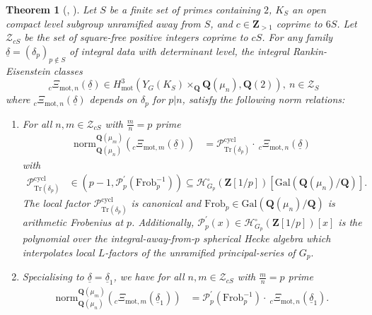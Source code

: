 \documentclass{amsart}%
\theoremstyle{plain}
\newtheorem{theorem}{Theorem}
\theoremstyle{plain}
\theoremstyle{remark}
\begin{document}
\begin{theorem}[, ]\label{thm intro A}Let $S$ be a finite set of primes containing $2$, $K_S$ an open compact level subgroup unramified away from $S$, and $c\in\mathbf{Z}_{>1}$ coprime to $6S$. Let $\mathscr{Z}_{cS}$ be the set of square-free positive integers coprime to $cS$. For \textit{any} family $\underline{\delta}=(\delta_p)_{p\notin S}$ of \textit{integral data with determinant level}, the integral Rankin-Eisenstein classes
$$_c\Xi_{\mathrm{mot},n}(\underline{\delta})\in H_\mathrm{mot}^3\left(Y_G(K_S)\times_\mathbf{Q}\mathbf{Q}(\mu_n),\mathbf{Q}(2)\right),\ n\in\mathscr{Z}_S$$
where $_c\Xi_{\mathrm{mot},n}(\underline{\delta})$ depends on $\delta_p$ for $p|n$, satisfy the following norm relations:
\begin{enumerate}
\item For all $n,m\in\mathscr{Z}_{cS}$ with $\tfrac{m}{n}=p$ prime
\begin{align*} 
\mathrm{norm}^{\mathbf{Q}(\mu_m)}_{\mathbf{Q}(\mu_n)}\left(_c\Xi_{\mathrm{mot},m}(\underline{\delta})\right)&=\mathcal{P}_{\mathrm{Tr}(\delta_p)}^\mathrm{cycl}\cdot\ _c\Xi_{\mathrm{mot},n}(\underline{\delta})\end{align*}
with
\begin{align*}
\mathcal{P}_{\mathrm{Tr}(\delta_p)}^\mathrm{cycl}&\in\left(p-1,\mathcal{P}_p^{'}(\mathrm{Frob}_p^{-1})\right)\subseteq\mathcal{H}_{G_p}^\circ(\mathbf{Z}[1/p])[\mathrm{Gal}(\mathbf{Q}(\mu_n)/\mathbf{Q})].
\end{align*}
 The local factor $\mathcal{P}_{\mathrm{Tr}(\delta_p)}^\mathrm{cycl}$ is canonical and $\mathrm{Frob}_p\in \mathrm{Gal}(\mathbf{Q}(\mu_n)/\mathbf{Q})$ is arithmetic Frobenius at $p$. Additionally, $\mathcal{P}_p^{'}(x)\in\mathcal{H}_{G_p}^\circ(\mathbf{Z}[1/p])[x]$ is the polynomial over the integral-away-from-$p$ spherical Hecke algebra which interpolates local $L$-factors of the unramified principal-series of $G_p.$
 \item Specialising to $\underline{\delta}=\underline{\delta}_1$, we have for all $n,m\in\mathscr{Z}_{cS}$ with $\tfrac{m}{n}=p$ prime 
\begin{align*}
    \mathrm{norm}^{\mathbf{Q}(\mu_m)}_{\mathbf{Q}(\mu_n)}(_c\Xi_{\mathrm{mot},m}(\underline{\delta}_1))&=
        \mathcal{P}_p^{'}(\mathrm{Frob}_p^{-1})\cdot\ _c\Xi_{\mathrm{mot},n}\left(\underline{\delta}_1\right).
\end{align*} 
\end{enumerate}
\end{theorem}
\end{document}
